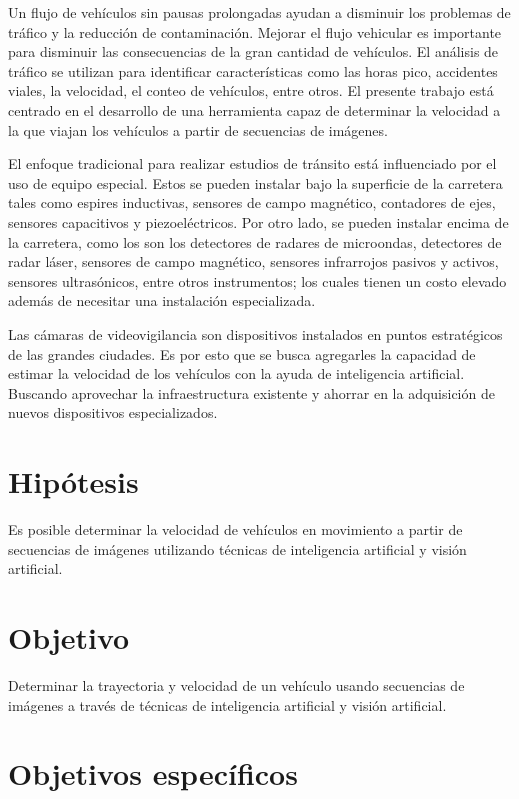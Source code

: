 Un flujo de vehículos sin pausas prolongadas ayudan a disminuir los problemas de tráfico y la reducción de contaminación. Mejorar el flujo vehicular es importante para disminuir las consecuencias de la gran cantidad de vehículos. El análisis de tráfico se utilizan para identificar características como las horas pico, accidentes viales, la velocidad, el conteo de vehículos, entre otros. El presente trabajo está centrado en el desarrollo de una herramienta capaz de determinar la velocidad a la que viajan los vehículos a partir de secuencias de imágenes.

El enfoque tradicional para realizar estudios de tránsito está influenciado por el uso de equipo especial. Estos se pueden instalar bajo la superficie de la carretera tales como espires inductivas, sensores de campo magnético, contadores de ejes, sensores capacitivos y piezoeléctricos. Por otro lado, se pueden instalar encima de la carretera, como los son los detectores de radares de microondas, detectores de radar láser, sensores de campo magnético, sensores infrarrojos pasivos y activos, sensores ultrasónicos, entre otros instrumentos; los cuales tienen un costo elevado además de necesitar una instalación especializada.

Las cámaras de videovigilancia son dispositivos instalados en puntos estratégicos de las grandes ciudades. Es por esto que se busca agregarles la capacidad de estimar la velocidad de los vehículos con la ayuda de inteligencia artificial. Buscando aprovechar la infraestructura existente y ahorrar en la adquisición de nuevos dispositivos especializados.

\section{Hipótesis}

Es posible determinar la velocidad de vehículos en movimiento a partir de secuencias de imágenes utilizando técnicas de inteligencia artificial y visión artificial.

\section{Objetivo}

Determinar la trayectoria y velocidad de un vehículo usando secuencias de imágenes a través de técnicas de inteligencia artificial y visión artificial.

\section{Objetivos específicos}

